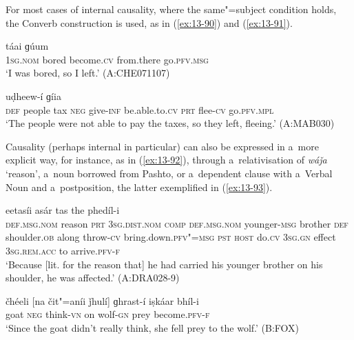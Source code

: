 For most cases of internal causality, where the same"=subject condition holds, the Converb construction is used, as in (\ref{ex:13-90}) and (\ref{ex:13-91}).

\begin{exe}
\ex
\label{ex:13-90}
 táai ɡúum  \\
\textsc{1sg.nom} bored become.\textsc{cv} from.there go.\textsc{pfv.msg}  \\
\glt `I was bored, so I left.' (A:CHE071107)

\ex
\label{ex:13-91}
 uḍheew-í ɡíia \\
 \textsc{def} people tax \textsc{neg} give-\textsc{inf} be.able.to.\textsc{cv} \textsc{prt}  flee-\textsc{cv}  go.\textsc{pfv.mpl}   \\
\glt `The people were not able to pay the taxes, so they left, fleeing.' (A:MAB030) 
\end{exe}

Causality (perhaps internal in particular) can also be expressed in a~more explicit way, for instance, as in (\ref{ex:13-92}), through a~relativisation of \textit{wáǰa} `reason', a~noun borrowed from Pashto, or a~dependent clause with a~Verbal Noun and a~postposition, the latter exemplified in (\ref{ex:13-93}).

\begin{exe}
\ex
\label{ex:13-92}
 eetasíi asár tas the phedíl-i \\
\textsc{def.msg.nom} reason \textsc{prt} \textsc{3sg.dist.nom} \textsc{comp} \textsc{def.msg.nom} younger-\textsc{msg} brother \textsc{def}{\protect\footnotemark} shoulder.\textsc{ob} along throw-\textsc{cv} bring.down.\textsc{pfv"=msg} \textsc{pst} \textsc{host} do.\textsc{cv}  \textsc{3sg.gn} effect \textsc{3sg.rem.acc} to arrive.\textsc{pfv-f} \\
\glt `Because [lit. for the reason that] he had carried his younger brother on his shoulder, he was affected.' (A:DRA028-9)

\ex
\label{ex:13-93}
\gll čhéeli [na čit"=aníi ǰhulí] ɡhrast-í iṣkáar bhíl-i \\
goat \textsc{neg} think-\textsc{vn} on wolf-\textsc{gn} prey become.\textsc{pfv-f}  \\
\glt `Since the goat didn't really think, she fell prey to the wolf.' (B:FOX)
\end{exe}


